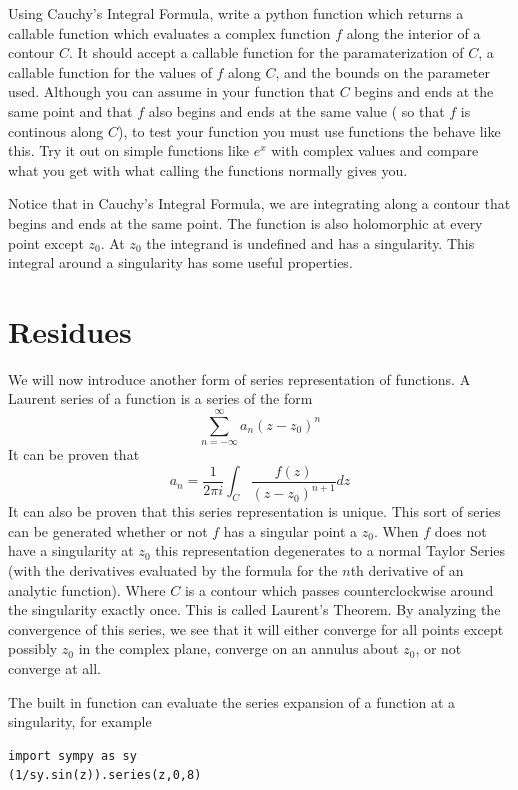 \begin{problem}
Using Cauchy's Integral Formula, write a python function which returns a callable function which evaluates a complex function $f$ along the interior of a contour $C$. It should accept a callable function for the paramaterization of $C$, a callable function for the values of $f$ along $C$, and the bounds on the parameter used. Although you can assume in your function  that $C$ begins and ends at the same point and that $f$ also begins and ends at the same value ( so that $f$ is continous along $C$), to test your function you must use functions the behave like this. Try it out on simple functions like $e^x$ with complex values and compare what you get with what calling the functions normally gives you.
\end{problem}

Notice that in Cauchy's Integral Formula, we are integrating along a contour that begins and ends at the same point.
The function is also holomorphic at every point except $z_0$. At $z_0$ the integrand is undefined and has a singularity.
This integral around a singularity has some useful properties.

\section*{Residues}

We will now introduce another form of series representation of functions.
A Laurent series of a function is a series of the form $$\sum_{n= -\infty}^{\infty} a_n (z-z_0)^n$$
It can be proven that 
$$a_n = \frac{1}{2\pi i} \int_C \frac{f(z)}{(z-z_0)^{n+1}} dz$$ 
It can also be proven that this series representation is unique.
This sort of series can be generated whether or not $f$ has a singular point a $z_0$.
When $f$ does not have a singularity at $z_0$ this representation degenerates to a normal Taylor Series (with the derivatives evaluated by the formula for the $n$th derivative of an analytic function).
Where $C$ is a contour which passes counterclockwise around the singularity exactly once.
This is called Laurent's Theorem.
By analyzing the convergence of this series, we see that it will either converge for all points except possibly $z_0$ in the complex plane, converge on an annulus about $z_0$, or not converge at all.

The built in function  can evaluate the series expansion of a function at a singularity, for example
\begin{lstlisting}
import sympy as sy
(1/sy.sin(z)).series(z,0,8)
\end{lstlisting}

